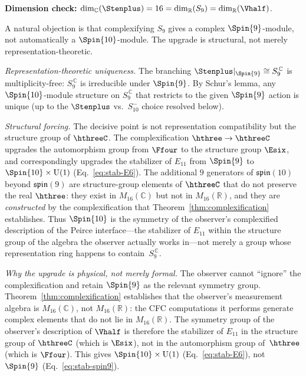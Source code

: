 \noindent\textbf{Dimension check:}
$\dim_\mathbb{C}(\Stenplus) = 16 = \dim_\mathbb{R}(S_9)
= \dim_\mathbb{R}(\Vhalf)$.\ \checkmark

\begin{remark}
\label{rem:why-spin10}
A natural objection is that complexifying $S_9$ gives a complex
$\Spin{9}$-module, not automatically a $\Spin{10}$-module.  The
upgrade is structural, not merely representation-theoretic.

\emph{Representation-theoretic uniqueness.}\enspace
The branching $\Stenplus|_{\Spin{9}} \cong S_9^{\,\mathbb{C}}$
is multiplicity-free: $S_9^{\,\mathbb{C}}$ is irreducible under
$\Spin{9}$.  By Schur's lemma, any $\Spin{10}$-module structure on
$S_9^{\,\mathbb{C}}$ that restricts to the given $\Spin{9}$ action is
unique (up to the $\Stenplus$ vs.\ $S_{10}^-$ choice resolved below).

\emph{Structural forcing.}\enspace
The decisive point is not representation compatibility but
the structure group of $\hthreeC$.
The complexification $\hthree \to \hthreeC$ upgrades the
automorphism group from $\Ffour$ to the structure group $\Esix$,
and correspondingly upgrades the stabilizer of $E_{11}$ from
$\Spin{9}$ to $\Spin{10}\times\mathrm{U}(1)$
(Eq.~\eqref{eq:stab-E6}).  The additional $9$ generators of
$\mathfrak{spin}(10)$ beyond $\mathfrak{spin}(9)$ are
structure-group elements of $\hthreeC$ that do not preserve the real
$\hthree$: they exist in $M_{16}(\mathbb{C})$ but not in
$M_{16}(\mathbb{R})$, and they are \emph{constructed} by the
complexification that Theorem~\ref{thm:complexification} establishes.
Thus $\Spin{10}$ is the symmetry of the observer's complexified
description of the Peirce interface---the stabilizer of $E_{11}$
within the structure group of the algebra the observer actually
works in---not merely a group whose representation ring happens
to contain~$S_9^{\,\mathbb{C}}$.

\emph{Why the upgrade is physical, not merely formal.}\enspace
The observer cannot ``ignore'' the complexification and retain
$\Spin{9}$ as the relevant symmetry group.
Theorem~\ref{thm:complexification} establishes that the
observer's measurement algebra is $M_{16}(\mathbb{C})$, not
$M_{16}(\mathbb{R})$: the CFC computations it performs
generate complex elements that do not lie in
$M_{16}(\mathbb{R})$.  The symmetry group of the observer's
description of $\Vhalf$ is therefore the stabilizer of $E_{11}$
in the structure group of $\hthreeC$ (which is $\Esix$), not in
the automorphism group of~$\hthree$ (which is $\Ffour$).  This
gives $\Spin{10}\times\mathrm{U}(1)$
(Eq.~\eqref{eq:stab-E6}), not $\Spin{9}$
(Eq.~\eqref{eq:stab-spin9}).
\end{remark}

